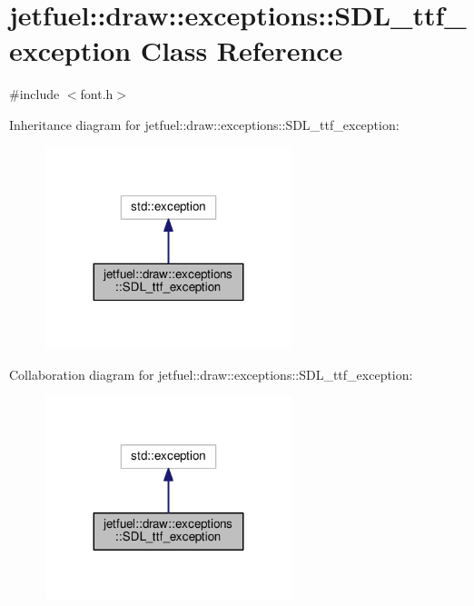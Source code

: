 \hypertarget{classjetfuel_1_1draw_1_1exceptions_1_1SDL__ttf__exception}{}\section{jetfuel\+:\+:draw\+:\+:exceptions\+:\+:S\+D\+L\+\_\+ttf\+\_\+exception Class Reference}
\label{classjetfuel_1_1draw_1_1exceptions_1_1SDL__ttf__exception}


{\ttfamily \#include $<$font.\+h$>$}



Inheritance diagram for jetfuel\+:\+:draw\+:\+:exceptions\+:\+:S\+D\+L\+\_\+ttf\+\_\+exception\+:
\nopagebreak
\begin{figure}[H]
\begin{center}
\leavevmode
\includegraphics[width=203pt]{classjetfuel_1_1draw_1_1exceptions_1_1SDL__ttf__exception__inherit__graph}
\end{center}
\end{figure}


Collaboration diagram for jetfuel\+:\+:draw\+:\+:exceptions\+:\+:S\+D\+L\+\_\+ttf\+\_\+exception\+:
\nopagebreak
\begin{figure}[H]
\begin{center}
\leavevmode
\includegraphics[width=203pt]{classjetfuel_1_1draw_1_1exceptions_1_1SDL__ttf__exception__coll__graph}
\end{center}
\end{figure}
